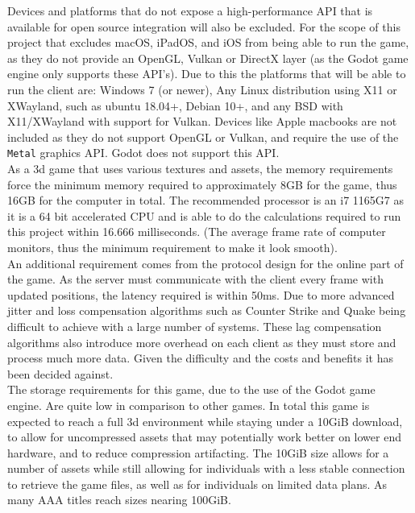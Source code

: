 \documentclass[12pt, DIV=calc]{scrartcl}
\begin{document}
\noindent Devices and platforms that do not expose a high-performance API that is available for open source integration will also be excluded. For the scope of this project that excludes macOS, iPadOS, and iOS from being able to run the game, as they do not provide an OpenGL, Vulkan or DirectX layer (as the Godot game engine only supports these API's). Due to this the platforms that will be able to run the client are: Windows 7 (or newer), Any Linux distribution using X11 or XWayland, such as ubuntu 18.04+, Debian 10+, and any BSD with X11/XWayland with support for Vulkan. Devices like Apple macbooks are not included as they do not support OpenGL or Vulkan, and require the use of the \texttt{Metal} graphics API. Godot does not support this API. \\

\noindent As a 3d game that uses various textures and assets, the memory requirements force the minimum memory required to approximately 8GB for the game, thus 16GB for the computer in total. The recommended processor is an i7 1165G7 as it is a 64 bit accelerated CPU and is able to do the calculations required to run this project within 16.666 milliseconds. (The average frame rate of computer monitors, thus the minimum requirement to make it look smooth). \\

\noindent An additional requirement comes from the protocol design for the online part of the game. As the server must communicate with the client every frame with updated positions, the latency required is within 50ms. Due to more advanced jitter and loss compensation algorithms such as Counter Strike and Quake being difficult to achieve with a large number of systems. These lag compensation algorithms also introduce more overhead on each client as they must store and process much more data. Given the difficulty and the costs and benefits it has been decided against. \\ 

\noindent The storage requirements for this game, due to the use of the Godot game engine. Are quite low in comparison to other games. In total this game is expected to reach a full 3d environment while staying under a 10GiB download, to allow for uncompressed assets that may potentially work better on lower end hardware, and to reduce compression artifacting. The 10GiB size allows for a number of assets while still allowing for individuals with a less stable connection to retrieve the game files, as well as for individuals on limited data plans. As many AAA titles reach sizes nearing 100GiB.
\end{document}
